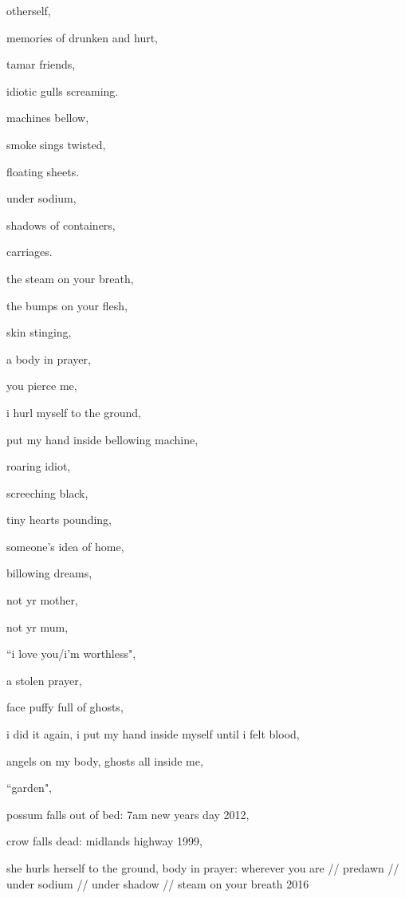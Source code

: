 \documentclass{article}
\begin{document}
	otherself,

	memories of drunken and hurt,

	tamar friends,

	idiotic gulls screaming.\newpage

	machines bellow,

	smoke sings twisted,

	floating sheets.

	under sodium,

	shadows of containers,

	carriages.\newpage

	the steam on your breath,

	the bumps on your flesh,

	skin stinging,

	a body in prayer,

	you pierce me,

	i hurl myself to the ground,

	put my hand inside bellowing machine,

	roaring idiot,

	screeching black,

	tiny hearts pounding,

	someone's idea of home,

	billowing dreams,

	not yr mother,

	not yr mum,

	``i love you/i'm worthless",

	a stolen prayer,

	face puffy full of ghosts,

	i did it again, i put my hand inside myself until i felt blood,

	angels on my body, ghosts all inside me,\newpage

	``garden",

	possum falls out of bed: 7am new years day 2012,

	crow falls dead: midlands highway 1999,

	she hurls herself to the ground, body in prayer: wherever you are // 
	predawn // under sodium // under shadow // steam on your breath 2016
\end{document}
